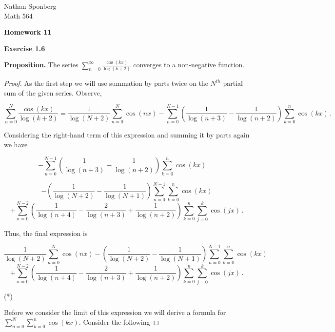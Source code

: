 \documentclass[a4paper]{article}
\numberwithin{equation}{section}
\begin{document}
\begin{flushright}
{\small{Nathan Sponberg\\}}
{\small{Math 564}}
\end{flushright}

\begin{center}
\bf{Homework 11}
\end{center}

\begin{description}

\item \textbf{Exercise 1.6}

\item \textbf{Proposition.} The series $\sum \limits_{n=0}^\infty\frac{\cos(kx)}{\log(k+2)}$ converges to a non-negative function.

\item\begin{proof} As the first step we will use summation by parts twice on the $N^{th}$ partial sum of the given series. Observe,

$$\sum \limits_{n=0}^N\frac{\cos(kx)}{\log(k+2)} = \frac{1}{\log(N+2)}\sum \limits_{n=0}^N\cos(nx) - \sum \limits_{n=0}^{N-1}\left( \frac{1}{\log(n+3)} -\frac{1}{\log(n+2)} \right)\sum \limits_{k=0}^{n}\cos(kx)\,.$$

Considering the right-hand term of this expression and summing it by parts again we have

$$- \sum \limits_{n=0}^{N-1}\left( \frac{1}{\log(n+3)} -\frac{1}{\log(n+2)} \right)\sum \limits_{k=0}^{n}\cos(kx) =$$

$$-\left( \frac{1}{\log(N+2)} -\frac{1}{\log(N+1)} \right)\sum \limits_{n=0}^{N-1}\sum \limits_{k=0}^{n}\cos(kx)$$
$$+ \sum \limits_{n=0}^{N-2}\left( \frac{1}{\log(n+4)} -\frac{2}{\log(n+3)} +\frac{1}{\log(n+2)} \right)\sum \limits_{k=0}^{n}\sum \limits_{j=0}^{k}\cos(jx)\,.$$

Thus, the final expression is

$$\frac{1}{\log(N+2)}\sum \limits_{n=0}^N\cos(nx)-\left( \frac{1}{\log(N+2)} -\frac{1}{\log(N+1)} \right)\sum \limits_{n=0}^{N-1}\sum \limits_{k=0}^{n}\cos(kx)$$
$$+ \sum \limits_{n=0}^{N-2}\left( \frac{1}{\log(n+4)} -\frac{2}{\log(n+3)} +\frac{1}{\log(n+2)} \right)\sum \limits_{k=0}^{n}\sum \limits_{j=0}^{k}\cos(jx)\,.$$\begin{flushright}
(*)
\end{flushright}

Before we consider the limit of this expression we will derive a formula for $\sum_{n=0}^{N}\sum_{k=0}^{n}\cos(kx)$. Consider the following


\end{proof}
\end{description}
\end{document}

